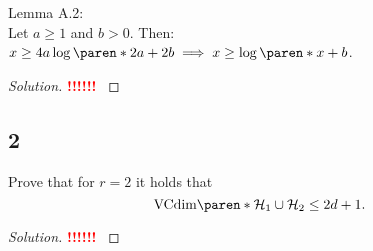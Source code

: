 \documentclass[10pt, a4paper, twoside]{amsart}
\DeclarePairedDelimiter\paren()
\newcommand{\cH}{\ensuremath{\mathcal{H}}}
\newenvironment{solution}
               {\let\oldqedsymbol=\qedsymbol
                \renewcommand{\qedsymbol}{$\blacktriangleleft$}
                \begin{proof}[Solution]}
               {\end{proof}
                \renewcommand{\qedsymbol}{\oldqedsymbol}}
\newcommand{\TODO}{\textcolor{red}{\textbf{!!!!!! }}}
\begin{document}
Lemma A.2:\\
Let $a \geq 1$ and $b>0$. Then: $x \geq 4a \log \paren*{2a} +2b \implies x \geq \log \paren*{x}+b$.
\begin{solution}
\TODO
\end{solution}
\subsection*{2}
Prove that for $r = 2$ it holds that
\begin{equation*}
  \text{VCdim}\paren*{\cH_1 \cup \cH_2}\leq 2d +1.
\end{equation*}
\begin{solution}
\TODO
\end{solution}
\end{document}
